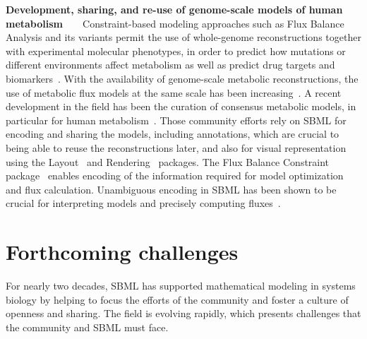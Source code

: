 \documentclass{sbml-paper}
\begin{document}
\textbf{Development, sharing, and re-use of genome-scale models of human metabolism}~~~~Constraint-based modeling approaches such as Flux Balance Analysis and its variants permit the use of whole-genome reconstructions together with experimental molecular phenotypes, in order to predict how mutations or different environments affect metabolism as well as predict drug targets and biomarkers~\citep{obrien2015}.  With the availability of genome-scale metabolic reconstructions, the use of metabolic flux models at the same scale has been increasing~\citep{Bordbar2014a}. A recent development in the field has been the curation of consensus metabolic models, in particular for human metabolism~\citep{brunk2018}. Those community efforts rely on SBML for encoding and sharing the models, including annotations, which are crucial to being able to reuse the reconstructions later, and also for visual representation using the Layout~\citep{Gauges2015} and Rendering~\citep{Bergmann2018sbml} packages. The Flux Balance Constraint package~\citep{Olivier2018a} enables encoding of the information required for model optimization and flux calculation.  Unambiguous encoding in SBML has been shown to be crucial for interpreting models and precisely computing fluxes~\citep{Ebrahim2015, Ravikrishnan2015critical}.

\hrulefill
\newpage

\section*{Forthcoming challenges}

For nearly two decades, SBML has supported mathematical modeling in systems biology by helping to focus the efforts of the community and foster a culture of openness and sharing.  The field is evolving rapidly, which presents challenges that the community and SBML must face.
\end{document}
